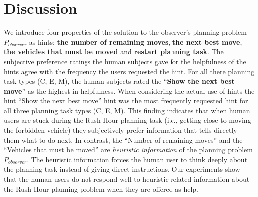 \section{Discussion}
We introduce four properties of the solution to the observer's planning problem $P_{observer}$ as hints: \textbf{the number of remaining moves}, \textbf{the next best move}, \textbf{the vehicles that must be moved} and \textbf{restart planning task}.
The subjective preference ratings the human subjects gave for the helpfulness of the hints agree with the frequency the users requested the hint.
For all there planning task types (C, E, M), the human subjects rated the ``\textbf{Show the next best move}'' as the highest in helpfulness.
When considering the actual use of hints the hint ``Show the next best move'' hint was the most frequently requested hint for all three planning task types (C, E, M).
This finding indicates that when human users are stuck during the Rush Hour planning task (i.e., getting close to moving the forbidden vehicle) they subjectively prefer information that tells directly them what to do next.
In contrast, the ``Number of remaining moves'' and the ``Vehicles that must be moved'' are \textit{heuristic information} of the planning problem $P_{observer}$.
The heuristic information forces the human user to think deeply about the planning task instead of giving direct instructions.
Our experiments show that the human users do not respond well to heuristic related information about the Rush Hour planning problem when they are offered as help.

